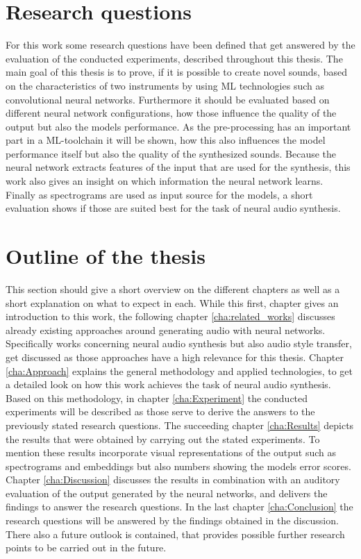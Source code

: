 \section{Research questions}
For this work some research questions have been defined that get answered by the evaluation of the conducted experiments, described throughout this thesis. The main goal of this thesis is to prove, if it is possible to create novel sounds, based on the characteristics of two instruments by using ML technologies such as convolutional neural networks. Furthermore it should be evaluated based on different neural network configurations, how those influence the quality of the output but also the models performance. As the pre-processing has an important part in a ML-toolchain it will be shown, how this also influences the model performance itself but also the quality of the synthesized sounds. Because the neural network extracts features of the input that are used for the synthesis, this work also gives an insight on which information the neural network learns. Finally as spectrograms are used as input source for the models, a short evaluation shows if those are suited best for the task of neural audio synthesis.

\section{Outline of the thesis}
This section should give a short overview on the different chapters as well as a short explanation on what to expect in each.
While this first, chapter gives an introduction to this work, the following chapter \ref{cha:related_works} discusses already existing approaches around generating audio with neural networks. Specifically works concerning neural audio synthesis but also audio style transfer, get discussed as those approaches have a high relevance for this thesis. Chapter \ref{cha:Approach} explains the general methodology and applied technologies, to get a detailed look on how this work achieves the task of neural audio synthesis. Based on this methodology, in chapter \ref{cha:Experiment} the conducted experiments will be described as those serve to derive the answers to the previously stated research questions. The succeeding chapter \ref{cha:Results} depicts the results that were obtained by carrying out the stated experiments. To mention these results incorporate visual representations of the output such as spectrograms and embeddings but also numbers showing the models error scores. Chapter \ref{cha:Discussion} discusses the results in combination with an auditory evaluation of the output generated by the neural networks, and delivers the findings to answer the research questions. In the last chapter \ref{cha:Conclusion} the research questions will be answered by the findings obtained in the discussion. There also a future outlook is contained, that provides possible further research points to be carried out in the future.